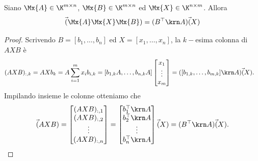\begin{lemma}
  Siano $ \Mx{A} \in \K^{m \times n} $, $ \Mx{B} \in \K^{m \times n}$ ed $ \Mx{X} \in \K^{n \times m}$. Allora
  \begin{equation*}
    \vec({\Mx{A}\Mx{X}\Mx{B}}) = (B^{\top} \krn A)\vec(X)
  \end{equation*}
\end{lemma}
\begin{proof}
  Scrivendo $ B = [b_1, \ldots, b_n] $ ed $ X = [x_1, \ldots, x_n] $, la $ k- $esima colonna di $
  AXB $ è 
  \begin{equation*}
    \begin{aligned}
      (AXB)_{:,k} &= AXb_k = A \sum_{i=1}^m x_i b_{i,k} = \left[ b_{1,k}A ,\ldots, b_{n,k}A \right]
      \begin{bmatrix} x_1 \\ \vdots \\ x_m \end{bmatrix} = ([b_{1,k}, \ldots, b_{m,k}] \krn A)
      \vec(X).
    \end{aligned}
  \end{equation*}
  Impilando insieme le colonne otteniamo che
  \begin{equation*}
  \vec(AXB) = \begin{bmatrix} (AXB)_{:,1} \\(AXB)_{:,2}\\ \vdots \\ (AXB)_{:,n} \end{bmatrix} =
  \begin{bmatrix} b_1^{\top} \krn A \\ b_2^{\top} \krn A \\ \vdots \\ b_n^{\top} \krn A
  \end{bmatrix} \vec(X) = (B^{\top} \krn A)\vec(X).
  \end{equation*}
\end{proof}

